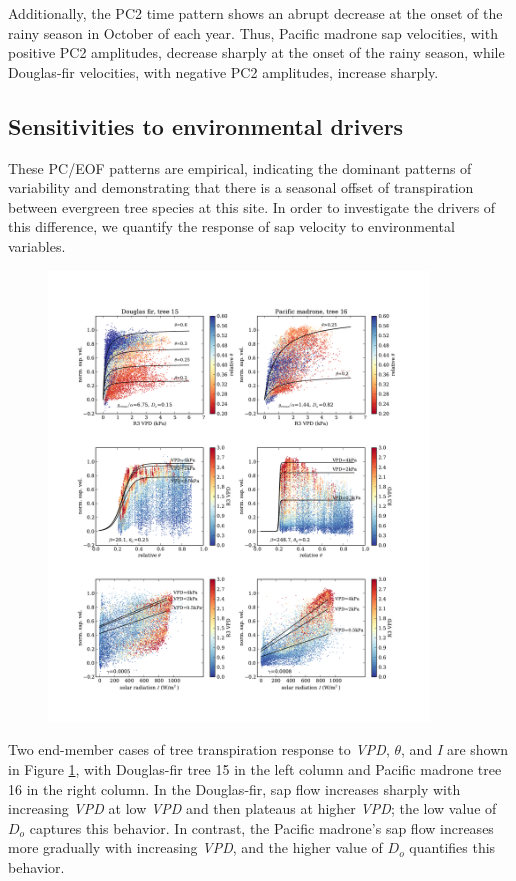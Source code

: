 Additionally, the PC2 time pattern shows an abrupt decrease at the onset of the rainy season in October of each year.  Thus, Pacific madrone sap velocities, with positive PC2 amplitudes, decrease sharply at the onset of the rainy season, while Douglas-fir velocities, with negative PC2 amplitudes, increase sharply.

\subsection{Sensitivities to environmental drivers}
\label{sec:envresponse}

These PC/EOF patterns are empirical, indicating the dominant patterns of variability and demonstrating that there is a seasonal offset of transpiration between evergreen tree species at this site.  In order to investigate the drivers of this difference, we quantify the response of sap velocity to environmental variables.

\begin{figure}[here]
\includegraphics[width=0.9\textwidth]{ch1-sapflow/figures/Figure06.pdf}
\caption{}
\label{fig:sapflow_scatter}
\end{figure}

Two end-member cases of tree transpiration response to \textit{VPD}, $\theta$, and \textit{I} are shown in Figure \ref{fig:sapflow_scatter}, with Douglas-fir tree 15 in the left column and Pacific madrone tree 16 in the right column.  In the Douglas-fir, sap flow increases sharply with increasing \textit{VPD} at low \textit{VPD} and then plateaus at higher \textit{VPD}; the low value of $D_o$ captures this behavior.  In contrast, the Pacific madrone's sap flow increases more gradually with increasing \textit{VPD}, and the higher value of $D_o$ quantifies this behavior.

